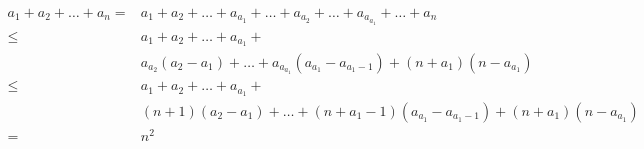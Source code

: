 \documentclass[12pt,a4paper]{article}
\theoremstyle{plain}
\theoremstyle{definition}
\theoremstyle{remark}
\begin{document}
\begin{enumerate}
\begin{align*}
a_1+a_2+\dots + a_n= & a_1+a_2+\dots + a_{a_1} + \dots + a_{a_2} + \dots + a_{a_{a_1}} + \dots + a_n  \\
\le & a_1+a_2+\dots +a_{a_1} + \\
& a_{a_2}(a_2-a_1)+\dots + a_{a_{a_1}}(a_{a_1}- a_{a_1-1}) + (n+a_1)(n- a_{a_1}) \\
\le &  a_1+a_2+\dots+  a_{a_1} +\\
& (n+1)(a_2-a_1)+\dots + (n+a_1-1)( a_{a_1}- a_{a_1-1}) + (n+a_1)(n- a_{a_1}) \\
= &n^2
\end{align*}

\end{enumerate}
\end{document}
